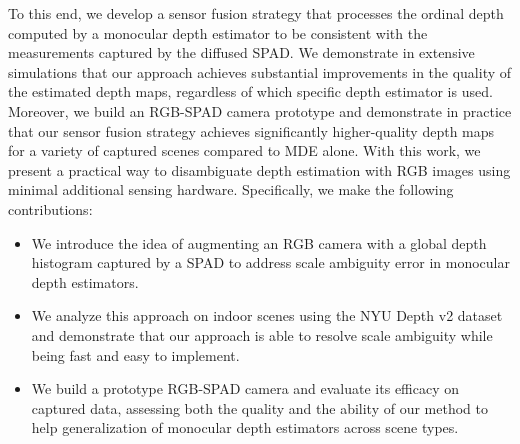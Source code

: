 
To this end, we develop a sensor fusion strategy that processes the ordinal depth computed by a monocular depth estimator to be consistent with the measurements captured by the diffused SPAD. We demonstrate in extensive simulations that our approach achieves substantial improvements in the quality of the estimated depth maps, regardless of which specific depth estimator is used. Moreover, we build an RGB-SPAD camera prototype and demonstrate in practice that our sensor fusion strategy achieves significantly higher-quality depth maps for a variety of captured scenes compared to MDE alone. With this work, we present a practical way to disambiguate depth estimation with RGB images using minimal additional sensing hardware. Specifically, we make the following contributions:
%
\begin{itemize}
	\item We introduce the idea of augmenting an RGB camera with a global depth histogram captured by a SPAD to address scale ambiguity error in monocular depth estimators.	
  \item We analyze this approach on indoor scenes using the NYU Depth v2 dataset and demonstrate that our approach is able to resolve scale ambiguity while being fast and easy to implement.
	\item We build a prototype RGB-SPAD camera and evaluate its efficacy on captured data, assessing both the quality and the ability of our method to help generalization of monocular depth estimators across scene types. 
\end{itemize}


